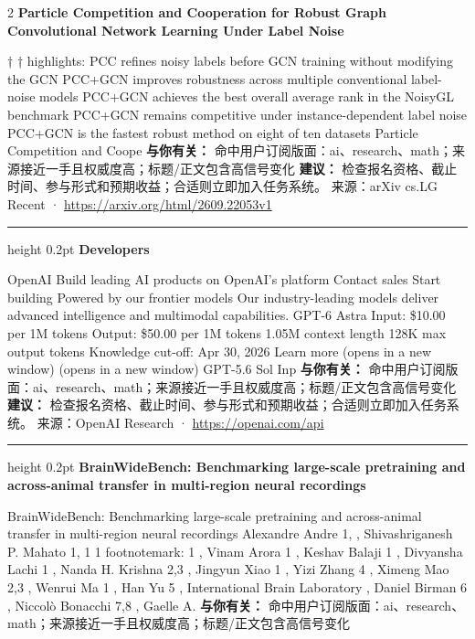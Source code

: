 \documentclass[10.5pt]{ctexart}
\begin{document}
\begin{multicols}{2}
{\large\bfseries Particle Competition and Cooperation for Robust Graph Convolutional Network Learning Under Label Noise}\par
[orcid=0000-0002-1123-9784] † † highlights: PCC refines noisy labels before GCN training without modifying the GCN PCC+GCN improves robustness across multiple conventional label-noise models PCC+GCN achieves the best overall average rank in the NoisyGL benchmark PCC+GCN remains competitive under instance-dependent label noise PCC+GCN is the fastest robust method on eight of ten datasets Particle Competition and Coope
\textbf{与你有关：} 命中用户订阅版面：ai、research、math；来源接近一手且权威度高；标题/正文包含高信号变化
\textbf{建议：} 检查报名资格、截止时间、参与形式和预期收益；合适则立即加入任务系统。
{\footnotesize\color{ormuted} 来源：arXiv cs.LG Recent · \url{https://arxiv.org/html/2609.22053v1}}
\vspace{2mm}
\hrule height 0.2pt
\vspace{2mm}
{\large\bfseries Developers}\par
OpenAI Build leading AI products on OpenAI’s platform Contact sales Start building Powered by our frontier models Our industry-leading models deliver advanced intelligence and multimodal capabilities. GPT-6 Astra Input: \$10.00 per 1M tokens Output: \$50.00 per 1M tokens 1.05M context length 128K max output tokens Knowledge cut-off: Apr 30, 2026 Learn more (opens in a new window) (opens in a new window) GPT-5.6 Sol Inp
\textbf{与你有关：} 命中用户订阅版面：ai、research、math；来源接近一手且权威度高；标题/正文包含高信号变化
\textbf{建议：} 检查报名资格、截止时间、参与形式和预期收益；合适则立即加入任务系统。
{\footnotesize\color{ormuted} 来源：OpenAI Research · \url{https://openai.com/api}}
\vspace{2mm}
\hrule height 0.2pt
\vspace{2mm}
{\large\bfseries BrainWideBench: Benchmarking large-scale pretraining and across-animal transfer in multi-region neural recordings}\par
BrainWideBench: Benchmarking large-scale pretraining and across-animal transfer in multi-region neural recordings Alexandre Andre 1, , Shivashriganesh P. Mahato 1, 1 1 footnotemark: 1 , Vinam Arora 1 , Keshav Balaji 1 , Divyansha Lachi 1 , Nanda H. Krishna 2,3 , Jingyun Xiao 1 , Yizi Zhang 4 , Ximeng Mao 2,3 , Wenrui Ma 1 , Han Yu 5 , International Brain Laboratory , Daniel Birman 6 , Niccolò Bonacchi 7,8 , Gaelle A.
\textbf{与你有关：} 命中用户订阅版面：ai、research、math；来源接近一手且权威度高；标题/正文包含高信号变化

\end{multicols}
\end{document}
